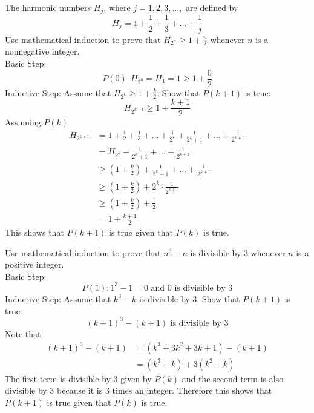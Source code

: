 \documentclass[12pt]{article}
\begin{document}
\begin{example} The harmonic numbers $H_j$, where $j = 1, 2, 3, \dots,$ are defined by $$H_j = 1 + \frac{1}{2} + \frac{1}{3} + \dots + \frac{1}{j} $$ Use mathematical induction to prove that $H_{2^n} \geq 1 + \frac{n}{2}$ whenever $n$ is a nonnegative integer. \\ Basic Step: $$P(0): H_{2^0} = H_1 = 1 \geq 1 + \frac{0}{2} $$ 
Inductive Step: Assume that $H_{2^k} \geq 1 + \frac{k}{2}$. Show that $P(k + 1)$ is true: $$H_{2^{k + 1}} \geq 1 + \frac{k + 1}{2}$$ Assuming $P(k)$ $$\begin{aligned} H_{2^{k + 1}} &= 1 + \frac{1}{2} + \frac{1}{3} + \dots + \frac{1}{2^k} + \frac{1}{2^k + 1} + \dots + \frac{1}{2^{k + 1}} \\ &= H_{2^k} + \frac{1}{2^k + 1} + \dots + \frac{1}{2^{k + 1}} \\ &\geq (1 + \frac{k}{2}) + \frac{1}{2^k + 1} + \dots + \frac{1}{2^{k + 1}} \\ &\geq (1 + \frac{k}{2}) + 2^k \cdot \frac{1}{2^{k + 1}} \\ &\geq (1 + \frac{k}{2}) + \frac{1}{2} \\ &= 1 + \frac{k + 1}{2} \end{aligned} $$ This shows that $P(k + 1)$ is true given that $P(k)$ is true. \end{example} 
\begin{example} Use mathematical induction to prove that $n^3 - n$ is divisible by 3 whenever $n$ is a positive integer. \\ Basic Step: $$P(1): 1^3 - 1 = 0 \text{ and 0 is divisible by 3} $$ 
Inductive Step: Assume that $k^3 - k$ is divisible by 3. Show that $P(k + 1)$ is true: $$(k + 1)^3 - (k + 1) \text{ is divisible by 3} $$ Note that $$ \begin{aligned} (k + 1)^3 - (k + 1) &= (k^3 + 3k^2 + 3k + 1) - (k + 1) \\ &= (k^3 - k) + 3(k^2 + k) \end{aligned} $$ The first term is divisible by 3 given by $P(k)$ and the second term is also divisible by 3 because it is 3 times an integer. Therefore this shows that $P(k + 1)$ is true given that $P(k)$ is true. \end{example} 
\end{document}
